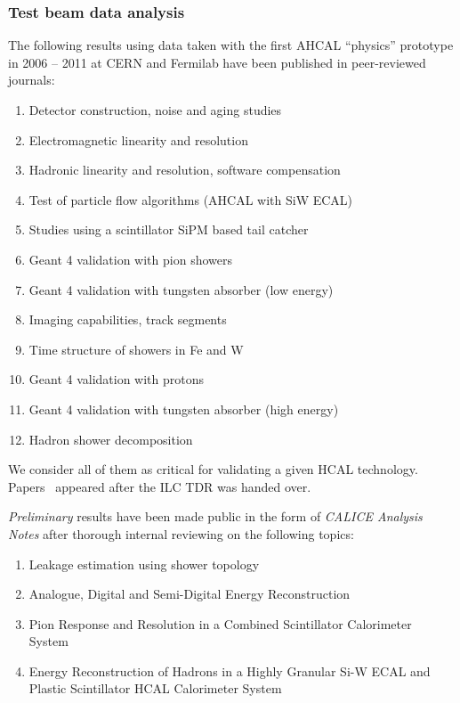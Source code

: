 \subsubsection{Test beam data analysis}
The following results using data taken with the first AHCAL ``physics'' prototype in 2006 -- 2011 at CERN and Fermilab have been published in peer-reviewed journals:
\begin{enumerate}
\item Detector construction, noise and aging studies~\cite{1748-0221-5-05-P05004}
\item Electromagnetic linearity and resolution~\cite{1748-0221-6-04-P04003}
\item Hadronic linearity and resolution, software compensation~\cite{1748-0221-7-09-P09017}
\item Test of particle flow algorithms (AHCAL with SiW ECAL)~\cite{1748-0221-6-07-P07005}
\item Studies using a scintillator SiPM based tail catcher~\cite{1748-0221-7-04-P04015}
\item Geant 4 validation with pion showers~\cite{1748-0221-8-07-P07005}
\item Geant 4 validation with tungsten absorber (low energy)~\cite{1748-0221-9-01-P01004}
\item Imaging capabilities, track segments~\cite{1748-0221-8-09-P09001}
\item Time structure of showers in Fe and W~\cite{1748-0221-9-07-P07022}
\item Geant 4 validation with protons~\cite{1748-0221-10-04-P04014}
\item Geant 4 validation with tungsten absorber (high energy)~\cite{Blaising:2015nla}
\item Hadron shower decomposition~\cite{Price:2016sce}
\end{enumerate}

We consider all of them as critical for validating a given HCAL technology. Papers~\cite{1748-0221-8-07-P07005, 1748-0221-9-01-P01004, 1748-0221-8-09-P09001, 1748-0221-9-07-P07022, 1748-0221-10-04-P04014, Blaising:2015nla, Price:2016sce} appeared after the ILC TDR was handed over.

\emph{Preliminary} results have been made public in the form of \emph{CALICE Analysis Notes} after thorough internal reviewing on the following topics:
\begin{enumerate}
\item Leakage estimation using shower topology~\cite{Marchesini:CAN029}
\item Analogue, Digital and Semi-Digital Energy Reconstruction~\cite{Calice:CAN049}
\item Pion Response and Resolution in a Combined Scintillator Calorimeter System~\cite{Calice:CAN056}
\item Energy Reconstruction of Hadrons in a Highly Granular Si-W ECAL and Plastic Scintillator HCAL Calorimeter System~\cite{Calice:CAN058}
\end{enumerate}

